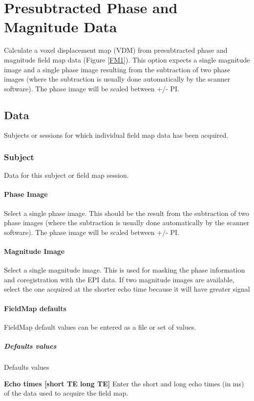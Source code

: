 \section{Presubtracted Phase and Magnitude Data}
Calculate a voxel displacement map (VDM) from presubtracted phase and magnitude field map data (Figure \ref{FM1}). This option expects a single magnitude image and a single phase image resulting from the subtraction of two phase images (where the subtraction is usually done automatically by the scanner software). The phase image will be scaled between +/- PI.


\subsection{Data}
Subjects or sessions for which individual field map data has been acquired.


\subsubsection{Subject}
Data for this subject or field map session.


\paragraph{Phase Image}
Select a single phase image. This should be the result from the subtraction of two phase images (where the subtraction is usually done automatically by the scanner software). The phase image will be scaled between +/- PI.


\paragraph{Magnitude Image}
Select a single magnitude image. This is used for masking the phase information and coregistration with the EPI data. If two magnitude images are available, select the one acquired at the shorter echo time because it will have greater signal


\paragraph{FieldMap defaults}
FieldMap default values can be entered as a file or set of values.


\subparagraph{Defaults values}
Defaults values


\textbf{Echo times [short TE long TE]}
Enter the short and long echo times (in ms) of the data used to acquire the field map.


